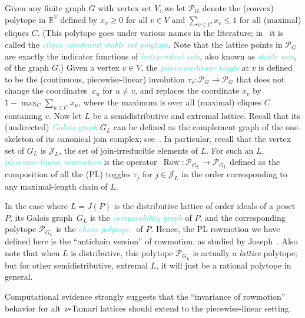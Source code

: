 \documentclass[11pt]{amsart}
\DeclareMathOperator{\row}{Row}
\newcommand{\dfn}[1]{\textcolor{Turquoise}{\emph{#1}}}
\theoremstyle{definition}
\begin{document}
Given any finite graph $G$ with vertex set $V$, we let $\mathcal{P}_G$ denote the (convex) polytope in $\mathbb{R}^V$ defined by $x_v \geq 0$ for all $v\in V$ and $\sum_{v \in C} x_v \leq 1$ for all (maximal) cliques $C$. (This polytope goes under various names in the literature; in~\cite{johnson2025piecewise} it is called the \dfn{clique constraint stable set polytope}. Note that the lattice points in $\mathcal{P}_G$ are exactly the indicator functions of \dfn{independent sets}, also known as \dfn{stable sets}, of the graph $G$.) Given a vertex $v \in V$, the \dfn{piecewise-linear toggle} at $v$ is defined to be the (continuous, piecewise-linear) involution $\tau_v\colon\mathcal{P}_G\to\mathcal{P}_G$ that does not change the coordinates~$x_u$ for $u \neq v$, and replaces the coordinate $x_v$ by $1-\max_C\sum_{u\in C}x_u$, where the maximum is over all (maximal) cliques $C$ containing $v$. Now let $L$ be a semidistributive and extremal lattice. Recall that its (undirected) \dfn{Galois graph} $G_L$ can be defined as the complement graph of the one-skeleton of its canonical join complex; see~\cite{barnard2019canonical, thomas2019rowmotion, thomas2019independence}. In particular, recall that the vertex set of $G_L$ is $\mathcal{J}_L$, the set of join-irreducible elements of $L$. For such an $L$, \dfn{piecewise-linear rowmotion} is the operator~$\row \colon \mathcal{P}_{G_L} \to \mathcal{P}_{G_L}$ defined as the composition of all the (PL) toggles $\tau_j$ for $j \in \mathcal{J}_L$ in the order corresponding to any maximal-length chain of $L$. 

In the case where $L=J(P)$ is the distributive lattice of order ideals of a poset $P$, its Galois graph~$G_L$ is the \dfn{comparability graph} of $P$, and the corresponding polytope $\mathcal{P}_{G_L}$ is the \dfn{chain polytope}~\cite{stanley1986two} of $P$. Hence, the PL rowmotion we have defined here is the ``antichain version'' of rowmotion, as studied by Joseph~\cite{joseph2019antichain}. Also note that when $L$ is distributive, this polytope $\mathcal{P}_{G_L}$ is actually a \emph{lattice} polytope; but for other semidistributive, extremal $L$, it will just be a rational polytope in general.

Computational evidence strongly suggests that the ``invariance of rowmotion'' behavior for alt~$\nu$-Tamari lattices should extend to the piecewise-linear setting.
\end{document}
